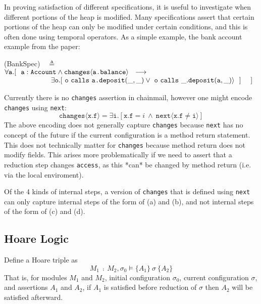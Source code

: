 \documentclass[12pt]{article}
\begin{document}
	In proving satisfaction of different specifications, it is useful to investigate when different portions of the heap is modified.
	Many specifications assert that certain portions of the heap can only be modified under certain conditions, and this is often 
	done using temporal operators. As a simple example, the bank account example from the paper:
	 
	  \vspace{.01in}
	(BankSpec)\ \  $\triangleq$\\ 
	$\forall \texttt{a}.[\ \ \texttt{a}:\texttt{Account} \wedge \texttt{changes}\langle{\texttt{a.balance}}\rangle  \ \    
	    \longrightarrow \ \    \hfill$ \\
	  $\strut \hspace{2.3cm} 
	  \exists \texttt{o}. [\    \texttt{o}\ \texttt{calls}\ {\texttt{a.}}{\texttt{deposit}}({\_,\_}) \vee\  \texttt{o}\ \texttt{calls}\ {\_.}{\texttt{deposit}}({\texttt{a},\_})\rangle\  \ ] \ \ \ \ ] \hfill $
	\vspace{.05in}
	
	Currently there is no \texttt{changes} assertion in  chainmail, however one might encode \texttt{changes} using \texttt{next}:
	$$\texttt{changes}\langle \texttt{x.f} \rangle = \exists \texttt{i}. [\texttt{x.f} = i\ \wedge\ \texttt{next}\langle \texttt{x.f}\neq \texttt{i} \rangle]$$
	The above encoding does not generally capture \texttt{changes} because \texttt{next} has no concept of the future if 
	the current configuration is a method return statement. This does not technically matter for \texttt{changes} because 
	method return does not modify fields. This arises more problematically if we need to assert that a reduction step 
	changes \texttt{access}, as this *can* be changed by method return (i.e. via the local enviroment).
	
	Of the 4 kinds of internal steps, a version of \texttt{changes} that is defined using \texttt{next} can only 
	capture internal steps of the form of (a) and (b), and not internal steps of the form of (c) and (d).
	
	\subsection{Hoare Logic}
	Define a Hoare triple as 
	$$M_1\ \fcmp\ M_	2, \sigma_0 \vDash \{A_1\}\ \sigma\ \{ A_2\}$$
	That is, for modules $M_1$ and $M_2$, initial configuration $\sigma_0$, current configuration $\sigma$, and assertions $A_1$ and $A_2$, 
	if $A_1$ is satisfied before reduction of $\sigma$ then $A_2$ will be satisfied afterward.
	
\end{document}
